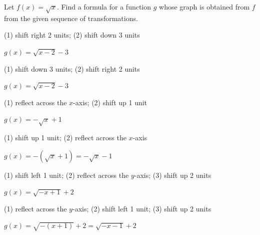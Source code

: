 \documentclass{ximera}
\begin{document}
\begin{question}
Let $f(x) = \sqrt{x}$.  Find a formula for a function $g$ whose graph is obtained from $f$ from the given sequence of transformations. 

\begin{problem}
(1) shift right 2 units; (2) shift down 3 units

\begin{solution}
    $g(x) = \sqrt{x-2} - 3$
\end{solution}
\end{problem}

\begin{problem}
(1) shift down 3 units; (2) shift right 2 units  

\begin{solution}
    $g(x) = \sqrt{x-2} - 3$
\end{solution}
\end{problem}  

\begin{problem}
(1) reflect across the $x$-axis; (2) shift up 1 unit

\begin{solution}
    $g(x) = -\sqrt{x} + 1$
\end{solution}
\end{problem}

\begin{problem}
(1) shift up 1 unit; (2) reflect across the $x$-axis

\begin{solution}
    $g(x) = -(\sqrt{x} + 1) = -\sqrt{x} - 1$
\end{solution}
\end{problem}
 
\begin{problem}
(1) shift left 1 unit; (2) reflect across the $y$-axis; (3) shift up 2 units

\begin{solution}
    $g(x) = \sqrt{-x+1} + 2$
\end{solution}
\end{problem}

\begin{problem}
(1) reflect across the $y$-axis;  (2) shift left 1 unit;  (3) shift up 2 units

\begin{solution}
    $g(x) = \sqrt{-(x+1)} + 2 = \sqrt{-x-1} + 2$
\end{solution}
\end{problem}


\end{question}
\end{document}
